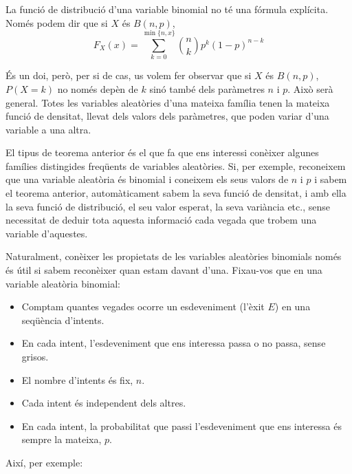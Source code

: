 \documentclass[
]{book}
\newenvironment{rmdblock}[1]
  {
  \begin{itemize}
  \renewcommand{\labelitemi}{
    \raisebox{-.7\height}[0pt][0pt]{
      {\setkeys{Gin}{width=3em,keepaspectratio}\texttt{[image: Bioestadística-II\_files/figure-html/\#1]}}
    }
  }
  \setlength{\fboxsep}{1em}
  \begin{kframe}
  \item
  }
  {
  \end{kframe}
  \end{itemize}
  }
\newenvironment{rmdnote}
  {\begin{rmdblock}{note}}
  {\end{rmdblock}}
\newenvironment{rmdimportant}
  {\begin{rmdblock}{important}}
  {\end{rmdblock}}
\theoremstyle{definition}
\theoremstyle{definition}
\theoremstyle{definition}
\theoremstyle{remark}
\begin{document}
\begin{rmdnote}
La funció de distribució d'una variable binomial no té una fórmula explícita. Només podem dir que si \(X\) és \(B(n,p)\),
\[
F_X(x)=\sum_{k=0}^{\min\{n,x\}} \binom{n}{k}p^k(1-p)^{n-k}
\]
\end{rmdnote}

\begin{rmdimportant}
És un doi, però, per si de cas, us volem fer observar que si \(X\) és \(B(n,p)\), \(P(X=k)\) no només depèn de \(k\) sinó també dels paràmetres \(n\) i \(p\). Això serà general. Totes les variables aleatòries d'una mateixa família tenen la mateixa funció de densitat, llevat dels valors dels paràmetres, que poden variar d'una variable a una altra.
\end{rmdimportant}

El tipus de teorema anterior és el que fa que ens interessi conèixer algunes famílies distingides freqüents de variables aleatòries. Si, per exemple, reconeixem que una variable aleatòria és binomial i coneixem els seus valors de \(n\) i \(p\) i sabem el teorema anterior, automàticament sabem la seva funció de densitat, i amb ella la seva funció de distribució, el seu valor esperat, la seva variància etc., sense necessitat de deduir tota aquesta informació cada vegada que trobem una variable d'aquestes.

Naturalment, conèixer les propietats de les variables aleatòries binomials només és útil si sabem reconèixer quan estam davant d'una. Fixau-vos que en una variable aleatòria binomial:

\begin{itemize}
\item
  Comptam quantes vegades ocorre un esdeveniment (l'èxit \(E\)) en una seqüència d'intents.
\item
  En cada intent, l'esdeveniment que ens interessa passa o no passa, sense grisos.
\item
  El nombre d'intents és fix, \(n\).
\item
  Cada intent és independent dels altres.
\item
  En cada intent, la probabilitat que passi l'esdeveniment que ens interessa és sempre la mateixa, \(p\).
\end{itemize}

Així, per exemple:
\end{document}
